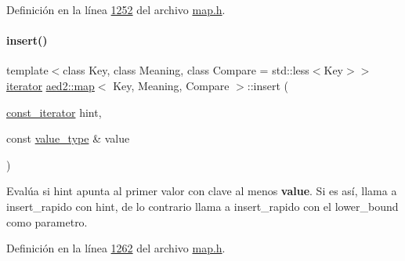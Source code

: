 Definición en la línea \hyperlink{map_8h_source_l01252}{1252} del archivo \hyperlink{map_8h_source}{map.\+h}.

\mbox{\label{classaed2_1_1map_a6941cde9a79c27f054b5c97a587a1854_a6941cde9a79c27f054b5c97a587a1854}} 
\paragraph{\texorpdfstring{insert()}{insert()}\hspace{0.1cm}{\footnotesize\ttfamily [2/2]}}
{\footnotesize\ttfamily template$<$class Key, class Meaning, class Compare = std\+::less$<$\+Key$>$$>$ \\
\hyperlink{classaed2_1_1map_1_1iterator}{iterator} \hyperlink{classaed2_1_1map}{aed2\+::map}$<$ Key, Meaning, Compare $>$\+::insert (\begin{DoxyParamCaption}\item[{\hyperlink{classaed2_1_1map_1_1const__iterator}{const\+\_\+iterator}}]{hint,  }\item[{const \hyperlink{classaed2_1_1map_a719db98e0ff9a837610f76be33264680_a719db98e0ff9a837610f76be33264680}{value\+\_\+type} \&}]{value }\end{DoxyParamCaption})\hspace{0.3cm}{\ttfamily [inline]}}

Evalúa si hint apunta al primer valor con clave al menos {\bfseries value}. Si es así, llama a insert\+\_\+rapido con hint, de lo contrario llama a insert\+\_\+rapido con el lower\+\_\+bound como parametro. 

Definición en la línea \hyperlink{map_8h_source_l01262}{1262} del archivo \hyperlink{map_8h_source}{map.\+h}.

\mbox{\label{classaed2_1_1map_a2ef6723c183916276b0afc4a4c721475_a2ef6723c183916276b0afc4a4c721475}} 
